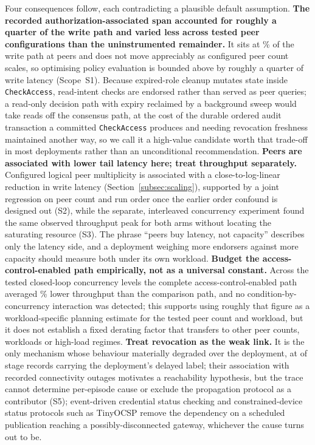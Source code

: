 \documentclass[a4paper,fleqn]{cas-sc}
\begin{document}
Four consequences follow, each contradicting a plausible default
assumption. \textbf{The recorded authorization-associated span accounted
for roughly a quarter of the write path and varied less across tested
peer configurations than the uninstrumented remainder.} It sits at
\PartAccessPct\% of the write path at \ScaleMinPeers{} peers and does not
move appreciably as configured peer count scales, so optimising policy
evaluation is bounded above by roughly a quarter of write latency
(Scope~S1). Because expired-role cleanup
mutates state inside \texttt{CheckAccess}, read-intent checks are endorsed
rather than served as peer queries; a read-only decision path with expiry
reclaimed by a background sweep would take reads off the consensus path, at
the cost of the durable ordered audit transaction a committed
\texttt{CheckAccess} produces and needing revocation freshness maintained
another way, so we call it a high-value candidate worth that trade-off in
most deployments rather than an unconditional recommendation.
\textbf{Peers are associated with lower tail latency here; treat
throughput separately.} Configured logical peer multiplicity is associated
with a close-to-log-linear reduction in write latency
(Section~\ref{subsec:scaling}), supported by a joint regression on peer
count and run order once the earlier order confound is designed out
(S2), while the separate, interleaved concurrency experiment found the
same observed throughput peak for both arms without locating the
saturating resource (S3). The phrase ``peers buy latency, not capacity'' describes
only the latency side, and a deployment weighing more endorsers against
more capacity should measure both under its own workload.
\textbf{Budget the access-control-enabled path empirically, not as a
universal constant.} Across the tested closed-loop concurrency levels the
complete access-control-enabled path averaged \OverheadMeanPct\% lower
throughput than the comparison path, and no condition-by-concurrency
interaction was detected; this supports using roughly that figure as a
workload-specific planning estimate for the tested peer count and
workload, but it does not establish a fixed derating factor that transfers
to other peer counts, workloads or high-load regimes. \textbf{Treat
revocation as the weak link.} It is the only
mechanism whose behaviour materially degraded over the deployment, at
\RevDelayed{} of \RevEvents{} stage records carrying the deployment's
delayed label; their association with recorded connectivity outages
motivates a reachability hypothesis, but the trace cannot determine
per-episode cause or exclude the propagation protocol as a contributor
(S5); event-driven credential status checking
\cite{w3c_vc_status_list} and constrained-device status protocols such as
TinyOCSP \cite{fedrecheski2023tinyocsp} remove the dependency on a
scheduled publication reaching a possibly-disconnected gateway, whichever
the cause turns out to be.
\end{document}
